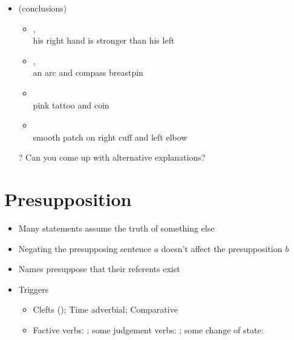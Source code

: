 \documentclass[a4paper,landscape,headrule,footrule,xetex]{foils}
\begin{document}

\begin{itemize}
\item {} \hfill (conclusions)
  \begin{itemize}
  \item  {}, 
    \\ his right hand is stronger than his left

  \item  {}, 
    \\ an arc and compass breastpin
  \item  {}
    \\ pink tattoo and coin
  \item  {}
    \\ smooth patch on right cuff and left elbow
  \end{itemize}
  \item[?] Can you come up with alternative explanations?\task
\end{itemize}



\section{Presupposition}


\begin{itemize}
\item Many statements assume the truth of something else
  \begin{exe}
    \ex   \begin{xlist}
    \ex {} %
    \ex {} %
    \end{xlist}
  \end{exe}
\item Negating the presupposing sentence $a$ doesn't affect the presupposition $b$
\item Names presuppose that their referents exist
\item Triggers 
  \begin{itemize}
  \item Clefts (); Time adverbial; Comparative
  \item Factive verbs: ; 
    some judgement verbs: ; 
    some change of state: 
    \end{itemize}
\end{itemize}
\end{document}

